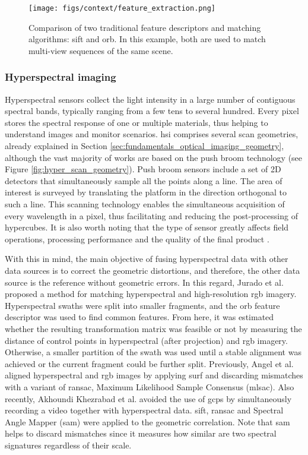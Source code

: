 \begin{figure}[ht]
	\texttt{[image: figs/context/feature\_extraction.png]}
	\caption{Comparison of two traditional feature descriptors and matching algorithms: \acrshort{sift} and  \acrshort{orb}. In this example, both are used to match multi-view sequences of the same scene.}
    \label{fig:feature_descriptors}
\end{figure}

\subsubsection{Hyperspectral imaging}

Hyperspectral sensors collect the light intensity in a large number of contiguous spectral bands, typically ranging from a few tens to several hundred. Every pixel stores the spectral response of one or multiple materials, thus helping to understand images and monitor scenarios. \acrshort{hsi} comprises several scan geometries, already explained in Section \ref{sec:fundamentals_optical_imaging_geometry}, although the vast majority of works are based on the push broom technology (see Figure \ref{fig:hyper_scan_geometry}). Push broom sensors include a set of 2D detectors that simultaneously sample all the points along a line. The area of interest is surveyed by translating the platform in the direction orthogonal to such a line. This scanning technology enables the simultaneous acquisition of every wavelength in a pixel, thus facilitating and reducing the post-processing of hypercubes. It is also worth noting that the type of sensor greatly affects field operations, processing performance and the quality of the final product \cite{adao_hyperspectral_2017}. 

With this in mind, the main objective of fusing hyperspectral data with other data sources is to correct the geometric distortions, and therefore, the other data source is the reference without geometric errors. In this regard, Jurado et al. \cite{jurado_efficient_2021} proposed a method for matching hyperspectral and high-resolution \acrshort{rgb} imagery. Hyperspectral swaths were split into smaller fragments, and the \acrshort{orb} feature descriptor was used to find common features. From here, it was estimated whether the resulting transformation matrix was feasible or not by measuring the distance of control points in hyperspectral (after projection) and \acrshort{rgb} imagery. Otherwise, a smaller partition of the swath was used until a stable alignment was achieved or the current fragment could be further split. Previously, Angel et al. \cite{angel_automated_2020} aligned hyperspectral and \acrshort{rgb} images by applying \acrshort{surf} and discarding mismatches with a variant of \acrshort{ransac}, Maximum Likelihood Sample Consensus (\acrshort{mlsac}). Also recently, Akhoundi Khezrabad et al. \cite{akhoundi_khezrabad_new_2022} avoided the use of \acrshort{gcp}s by simultaneously recording a video together with hyperspectral data. \acrshort{sift}, \acrshort{ransac} and Spectral Angle Mapper (\acrshort{sam}) were applied to the geometric correlation. Note that \acrshort{sam} helps to discard mismatches since it measures how similar are two spectral signatures regardless of their scale.

